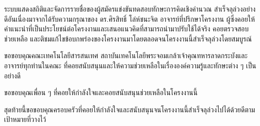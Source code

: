 ระบบแสดงสถิติและจัดการรายชื่อของผู้สมัครแข่งขันทดสอบทักษะการคิดเชิงคำนวณ สำเร็จลุล่วงอย่างดีอันเนื่องมาจากได้รับความกรุณาของ ดร.ศิรสิทธิ์ โล่ห์ชนะจิต อาจารย์ที่ปรึกษาโครงงาน ผู้ซึ่งคอยให้คำแนะนำที่เป็นประโยชน์ต่อโครงงานและเสนอแนวคิดที่สามารถนำมาปรับใช้ได้จริง คอยตรวจสอบ ช่วยเหลือ และติชมแก้ไขข้อบกพร่องของโครงงานมาโดยตลอดจนโครงงานนี้สำเร็จลุล่วงโดยสมบูรณ์

ขอขอบคุณคณะเทคโนโลยีสารสนเทศ สถาบันเทคโนโลยีพระจอมเกล้าเจ้าคุณทหารลาดกระบังและอาจารย์ทุกท่านในคณะ ที่คอยสนับสนุนและให้ความช่วยเหลือในเรื่ององค์ความรู้และทักษะต่าง ๆ เป็นอย่างดี

ขอขอบคุณเพื่อน ๆ ที่คอยให้กำลังใจและคอยสนับสนุนช่วยเหลือในโครงงานนี้

สุดท้ายนี้ขอขอบคุณครอบครัวที่คอยให้กำลังใจและสนับสนุนจนโครงงานนี้สำเร็จลุล่วงไปได้ด้วยดีตามเป้าหมายที่วางไว้